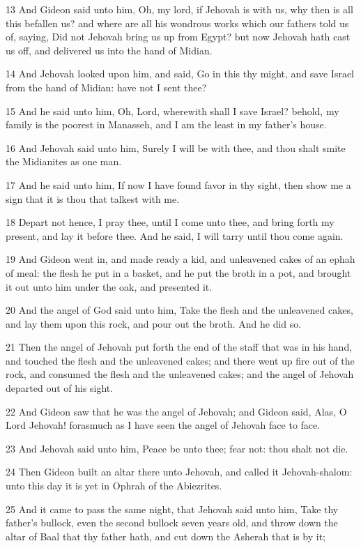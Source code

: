 \par 13 And Gideon said unto him, Oh, my lord, if Jehovah is with us, why then is all this befallen us? and where are all his wondrous works which our fathers told us of, saying, Did not Jehovah bring us up from Egypt? but now Jehovah hath cast us off, and delivered us into the hand of Midian.
\par 14 And Jehovah looked upon him, and said, Go in this thy might, and save Israel from the hand of Midian: have not I sent thee?
\par 15 And he said unto him, Oh, Lord, wherewith shall I save Israel? behold, my family is the poorest in Manasseh, and I am the least in my father's house.
\par 16 And Jehovah said unto him, Surely I will be with thee, and thou shalt smite the Midianites as one man.
\par 17 And he said unto him, If now I have found favor in thy sight, then show me a sign that it is thou that talkest with me.
\par 18 Depart not hence, I pray thee, until I come unto thee, and bring forth my present, and lay it before thee. And he said, I will tarry until thou come again.
\par 19 And Gideon went in, and made ready a kid, and unleavened cakes of an ephah of meal: the flesh he put in a basket, and he put the broth in a pot, and brought it out unto him under the oak, and presented it.
\par 20 And the angel of God said unto him, Take the flesh and the unleavened cakes, and lay them upon this rock, and pour out the broth. And he did so.
\par 21 Then the angel of Jehovah put forth the end of the staff that was in his hand, and touched the flesh and the unleavened cakes; and there went up fire out of the rock, and consumed the flesh and the unleavened cakes; and the angel of Jehovah departed out of his sight.
\par 22 And Gideon saw that he was the angel of Jehovah; and Gideon said, Alas, O Lord Jehovah! forasmuch as I have seen the angel of Jehovah face to face.
\par 23 And Jehovah said unto him, Peace be unto thee; fear not: thou shalt not die.
\par 24 Then Gideon built an altar there unto Jehovah, and called it Jehovah-shalom: unto this day it is yet in Ophrah of the Abiezrites.
\par 25 And it came to pass the same night, that Jehovah said unto him, Take thy father's bullock, even the second bullock seven years old, and throw down the altar of Baal that thy father hath, and cut down the Asherah that is by it;
